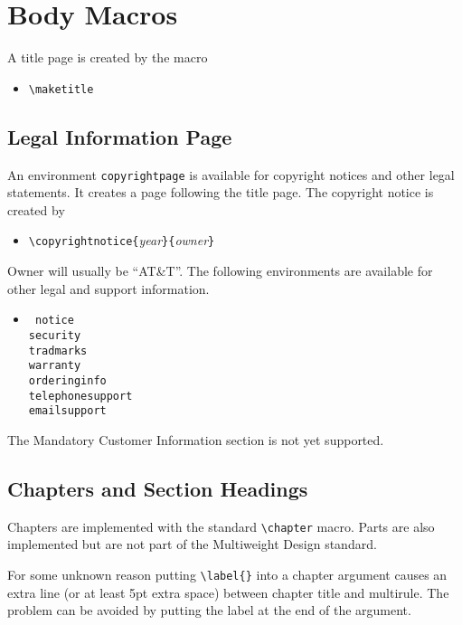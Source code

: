 \section{Body Macros}
A title page is created by the macro
\begin{itemize}
  \item[]\verb|\maketitle|
\end{itemize}

\subsection{Legal Information Page}

An environment \verb|copyrightpage| is available for copyright notices
and other legal statements.  It creates a page following the title
page.  The copyright notice is created by
\begin{itemize}
  \item[]\verb|\copyrightnotice{|{\it year}\verb|}{|{\it owner}\verb|}|
\end{itemize}
Owner will usually be ``AT\&T''.
The following environments are available for other legal and support
information. 
\begin{itemize}
  \item[]{\tt
        notice\\
        security\\
        tradmarks\\
        warranty\\
        orderinginfo\\
        telephonesupport\\
        emailsupport}
\end{itemize}
The Mandatory Customer Information section is not yet supported.
\subsection{Chapters and Section Headings}
Chapters are implemented with the standard \verb|\chapter| macro.
Parts are also implemented but are not part of the Multiweight Design
standard. 
\begin{note}
 For some unknown reason putting \verb|\label{}| into a chapter
        argument causes an extra line (or at least 5pt extra space)
        between chapter title and multirule.  The problem can be
        avoided by putting the label at the end of the argument.
\end{note}

